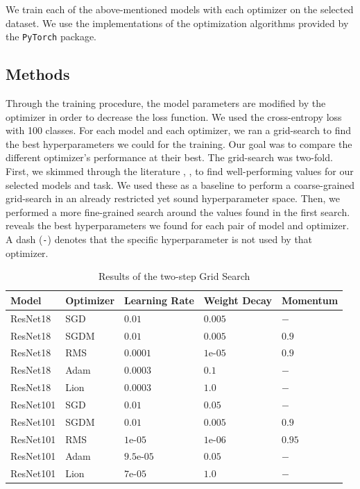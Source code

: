 \documentclass[10pt,conference,compsocconf]{IEEEtran}
\begin{document}
We train each of the above-mentioned models with each optimizer on the selected dataset. We use the implementations of the optimization algorithms provided by the \verb+PyTorch+ package.

\subsection{Methods}
Through the training procedure, the model parameters are modified by the optimizer in order to decrease the loss function. We used the cross-entropy loss with 100 classes. For each model and each optimizer, we ran a grid-search to find the best hyperparameters we could for the training. Our goal was to compare the different optimizer's performance at their best. The grid-search was two-fold. First, we skimmed through the literature \cite{hyperp1}, \cite{hyperp2}, \cite{hyperp3} to find well-performing values for our selected models and task. We used these as a baseline to perform a coarse-grained grid-search in an already restricted yet sound hyperparameter space. Then, we performed a more fine-grained search around the values found in the first search.  reveals the best hyperparameters we found for each pair of model and optimizer. A dash (\verb+-+) denotes that the specific hyperparameter is not used by that optimizer.

\begin{table}[htbp]
  \centering
  \caption{Results of the two-step Grid Search}
  \begin{tabular}[c]{|l|l||l|l|l|}
    \hline
    Model     & Optimizer & Learning Rate & Weight Decay & Momentum \\
    \hline
    ResNet18  & SGD       & $0.01$        & $0.005$      & $-$      \\
    ResNet18  & SGDM      & $0.01$        & $0.005$      & $0.9$    \\
    ResNet18  & RMS       & $0.0001$      & $1$e-$05$    & $0.9$    \\
    ResNet18  & Adam      & $0.0003$      & $0.1$        & $-$      \\
    ResNet18  & Lion      & $0.0003$      & $1.0$        & $-$      \\
    ResNet101 & SGD       & $0.01$        & $0.05$       & $-$      \\
    ResNet101 & SGDM      & $0.01$        & $0.005$      & $0.9$    \\
    ResNet101 & RMS       & $1$e-$05$     & $1$e-$06$    & $0.95$   \\
    ResNet101 & Adam      & $9.5$e-$05$   & $0.05$       & $-$      \\
    ResNet101 & Lion      & $7$e-$05$     & $1.0$        & $-$      \\
    \hline
  \end{tabular}
  \label{hyperparams}
\end{table}
\end{document}
